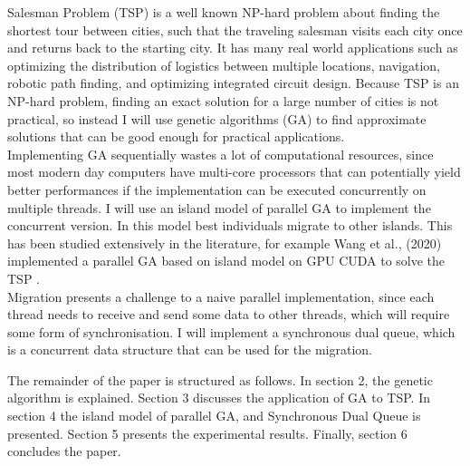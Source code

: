 \documentclass[10pt,journal,compsoc]{IEEEtran}
\begin{document}
% 
% 
% 
% 
 Salesman Problem (TSP) is a well known NP-hard problem about finding the shortest tour between cities, such that the traveling salesman visits each city once and returns back to the starting city. It has many real world applications such as optimizing the distribution of logistics between multiple locations, navigation, robotic path finding, and optimizing integrated circuit design. Because TSP is an NP-hard problem, finding an exact solution for a large number of cities is not practical, so instead I will use genetic algorithms (GA) to find approximate solutions that can be good enough for practical applications.\\
Implementing GA sequentially wastes a lot of computational resources, since most modern day computers have multi-core processors that can potentially yield better performances if the implementation can be executed concurrently on multiple threads. I will use an island model of parallel GA to implement the concurrent version. In this model best individuals migrate to other islands. This has been studied extensively in the literature, for example Wang et al., (2020) implemented a parallel GA based on island model on GPU CUDA to solve the TSP \cite{wang2020multipopulation}.\\
Migration presents a challenge to a naive parallel implementation, since each thread needs to receive and send some data to other threads, which will require some form of synchronisation. I will implement a synchronous dual queue, which is a concurrent data structure that can be used for the migration.

The remainder of the paper is structured as follows. In section 2, the genetic algorithm is explained. Section 3 discusses the application of GA to TSP. In section 4 the island model of parallel GA, and Synchronous Dual Queue is presented. Section 5 presents the experimental results. Finally, section 6 concludes the paper.
\end{document}
